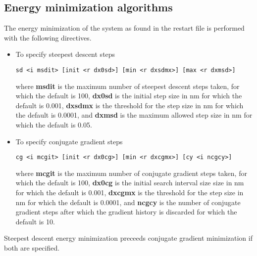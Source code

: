 \subsection{Energy minimization algorithms}
The energy minimization of the system as found in the restart file 
is performed with the following directives.
\begin{itemize}
\item
To specify steepest descent steps
\begin{verbatim}
sd <i msdit> [init <r dx0sd>] [min <r dxsdmx>] [max <r dxmsd>] 
\end{verbatim}
where {\bf msdit} is the maximum number of steepest descent steps taken,
for which the default is 100, {\bf dx0sd} is the initial step size in nm
for which the default is 0.001, {\bf dxsdmx} is the threshold for the
step size in nm for which the default is 0.0001, and {\bf dxmsd} is the
maximum allowed step size in nm for which the default is 0.05.
\item
To specify conjugate gradient steps
\begin{verbatim}
cg <i mcgit> [init <r dx0cg>] [min <r dxcgmx>] [cy <i ncgcy>]
\end{verbatim}
where {\bf mcgit} is the maximum number of conjugate gradient steps taken,
for which the default is 100, {\bf dx0cg} is the initial search
interval size size in nm
for which the default is 0.001, {\bf dxcgmx} is the threshold for the
step size in nm for which the default is 0.0001, and {\bf ncgcy}
is the number of conjugate gradient steps after which the gradient history
is discarded for which the default is 10.
\end{itemize}
Steepest descent energy minimization preceeds conjugate 
gradient minimization if both are specified.
